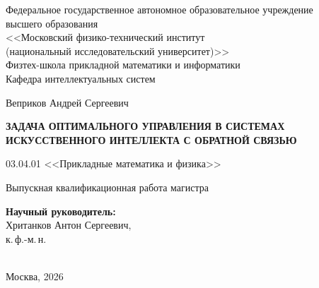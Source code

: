 \documentclass[a4paper,14pt,oneside,openany]{extarticle}
\begin{document}
\onehalfspacing

\thispagestyle{empty}
\begin{titlepage}
\begin{center}
Федеральное государственное автономное образовательное учреждение\\ высшего образования\\
<<Московский физико-технический институт\\
(национальный исследовательский университет)>>\\
Физтех-школа прикладной математики и информатики\\
Кафедра интеллектуальных систем
\end{center}
\vspace{0pt plus5fill}
\begin{center}
\large{Веприков Андрей Сергеевич}
\end{center}
\vspace{0pt}
\begin{center}
\textbf{\large\MakeUppercase{Задача оптимального управления в системах\\ искусственного интеллекта с обратной связью}}
\end{center}
\vspace{0pt}
\begin{center}
03.04.01 <<Прикладные математика и физика>>
\end{center}
\vspace{0pt}
\begin{center}
Выпускная квалификационная работа магистра
\end{center}
\vspace{0pt plus2fill}
\begin{center}
\hfill\parbox{8,4cm}{\textbf{Научный руководитель:}\\
Хританков Антон Сергеевич,\\
к.\,ф.-м.\,н.}\\
\vspace{0pt plus4fill}
Москва, 2026
\end{center}
\end{titlepage}
\setcounter{page}{2}

\makeatletter
\renewcommand\Huge{\@setfontsize\Huge{14pt}{1.5}}
\renewcommand\huge{\@setfontsize\huge{14pt}{1.5}}
\renewcommand\Large{\@setfontsize\Large{14pt}{1.5}}
\renewcommand\large{\@setfontsize\large{14pt}{1.5}}
\makeatother
\end{document}
